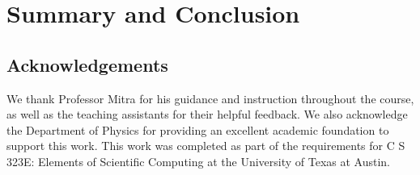 \documentclass[linenumbers, RNAAS, trackchanges]{aastex631}
\begin{document}
\section{Summary and Conclusion} \label{sec:summary}

\subsection{Acknowledgements}
We thank Professor Mitra for his guidance and instruction throughout the course,
as well as the teaching assistants for their helpful feedback. We also
acknowledge the Department of Physics for providing an excellent academic foundation 
to support this work. This work was completed as part of the requirements for 
C S 323E: Elements of Scientific Computing at the University of Texas at Austin.

\newpage


\end{document}
